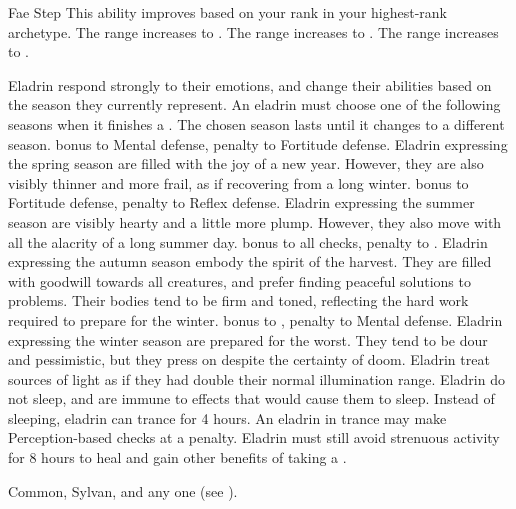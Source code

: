 \begin{raggeditemize}
\begin{freeability}{Fae Step}
                \rankline
                This ability improves based on your rank in your highest-rank archetype.
                 The range increases to \medrange.
                 The range increases to \longrange.
                 The range increases to \distrange.
            \end{freeability}
             Eladrin respond strongly to their emotions, and change their abilities based on the season they currently represent.
                An eladrin must choose one of the following seasons when it finishes a .
                The chosen season lasts until it changes to a different season.
                  bonus to Mental defense,  penalty to Fortitude defense.
                Eladrin expressing the spring season are filled with the joy of a new year.
                However, they are also visibly thinner and more frail, as if recovering from a long winter.
                  bonus to Fortitude defense,  penalty to Reflex defense.
                Eladrin expressing the summer season are visibly hearty and a little more plump.
                However, they also move with all the alacrity of a long summer day.
                  bonus to all checks,  penalty to .
                Eladrin expressing the autumn season embody the spirit of the harvest.
                They are filled with goodwill towards all creatures, and prefer finding peaceful solutions to problems.
                Their bodies tend to be firm and toned, reflecting the hard work required to prepare for the winter.
                  bonus to ,  penalty to Mental defense.
                Eladrin expressing the winter season are prepared for the worst.
                They tend to be dour and pessimistic, but they press on despite the certainty of doom.
             Eladrin treat sources of light as if they had double their normal illumination range.
             Eladrin do not sleep, and are immune to  effects that would cause them to sleep.
                Instead of sleeping, eladrin can trance for 4 hours.
                An eladrin in trance may make Perception-based checks at a  penalty.
                Eladrin must still avoid strenuous activity for 8 hours to heal and gain other benefits of taking a .
        \end{raggeditemize}
         Common, Sylvan, and any one  (see ).

